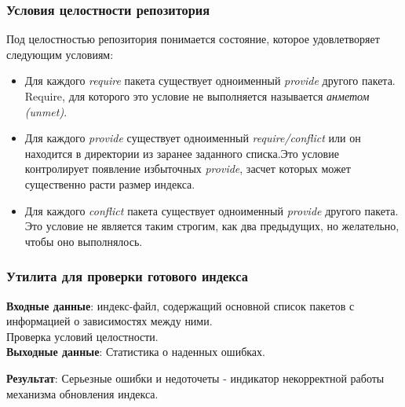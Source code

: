 \documentclass{beamer}
\begin{document}
\begin{frame}
\frametitle{Условия целостности репозитория}
Под целостностью
репозитория понимается состояние, которое удовлетворяет следующим
условиям:
\begin{itemize}
\item{Для каждого \textit{require} пакета существует одноименный \textit{provide} 
другого пакета. Require, для которого это условие не выполняется
называется \textit{анметом (unmet)}. }
\item{Для каждого \textit{provide} существует одноименный \textit{require/conflict} или
он находится в директории из заранее заданного списка.Это условие 
контролирует появление избыточных \textit{provide}, засчет которых
может существенно расти размер индекса.}
\item{Для каждого \textit{conflict} пакета существует одноименный \textit{provide} 
другого пакета. Это условие не является таким строгим, как два предыдущих,
но желательно, чтобы оно выполнялось. }
\end{itemize}
\end{frame}

\begin{frame}
\frametitle{Утилита для проверки готового индекса}
\textbf{Входные данные}: индекс-файл, содержащий основной
список пакетов с информацией о 
зависимостях между ними.\\

Проверка условий целостности.\\

\textbf{Выходные данные}: Статистика о наденных ошибках.

\textbf{Результат}: Серьезные ошибки и недоточеты - индикатор некорректной работы
механизма обновления индекса.
\end{frame}
\end{document}
